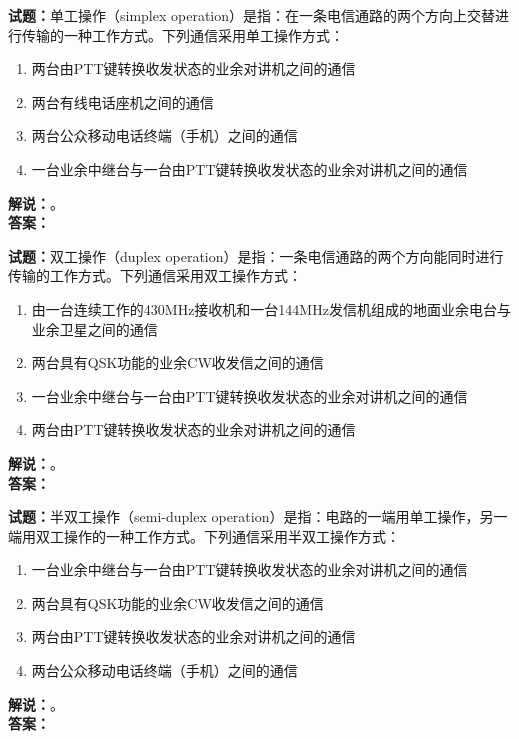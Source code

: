 \documentclass{ctexbook}
\begin{document}
\bigskip

\noindent\textbf{试题：}单工操作（simplex operation）是指：在一条电信通路的两个方向上交替进行传输的一种工作方式。下列通信采用单工操作方式：
\begin{enumerate}[leftmargin=3em]
  \item 两台由PTT键转换收发状态的业余对讲机之间的通信
  \item 两台有线电话座机之间的通信
  \item 两台公众移动电话终端（手机）之间的通信
  \item 一台业余中继台与一台由PTT键转换收发状态的业余对讲机之间的通信
\end{enumerate}
\noindent\textbf{解说：}\textbf{}。\\\noindent\textbf{答案：}

\bigskip

\noindent\textbf{试题：}双工操作（duplex operation）是指：一条电信通路的两个方向能同时进行传输的工作方式。下列通信采用双工操作方式：
\begin{enumerate}[leftmargin=3em]
  \item 由一台连续工作的430\unit{\MHz}接收机和一台144\unit{\MHz}发信机组成的地面业余电台与业余卫星之间的通信
  \item 两台具有QSK功能的业余CW收发信之间的通信
  \item 一台业余中继台与一台由PTT键转换收发状态的业余对讲机之间的通信
  \item 两台由PTT键转换收发状态的业余对讲机之间的通信
\end{enumerate}
\noindent\textbf{解说：}\textbf{}。\\\noindent\textbf{答案：}

\bigskip

\noindent\textbf{试题：}半双工操作（semi-duplex operation）是指：电路的一端用单工操作，另一端用双工操作的一种工作方式。下列通信采用半双工操作方式：
\begin{enumerate}[leftmargin=3em]
  \item 一台业余中继台与一台由PTT键转换收发状态的业余对讲机之间的通信
  \item 两台具有QSK功能的业余CW收发信之间的通信
  \item 两台由PTT键转换收发状态的业余对讲机之间的通信
  \item 两台公众移动电话终端（手机）之间的通信
\end{enumerate}
\noindent\textbf{解说：}\textbf{}。\\\noindent\textbf{答案：}

\bigskip
\end{document}
